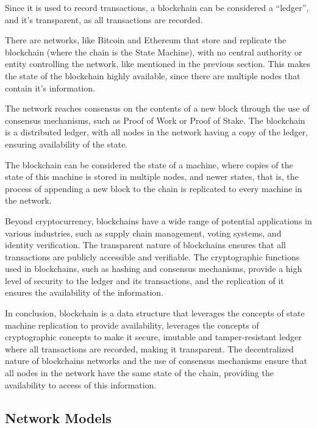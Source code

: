 Since it is used to record transactions, a blockchain can be considered a ``ledger'', and it's transparent, as all transactions are recorded.

There are networks, like Bitcoin and Ethereum that store and replicate the blockchain (where the chain is the State Machine), with no central authority or entity controlling the network, like mentioned in the previous section. This makes the state of the blockchain highly available, since there are multiple nodes that contain it's information. 

The network reaches consensus on the contents of a new block through the use of consensus mechanisms, such as Proof of Work or Proof of Stake.
The blockchain is a distributed ledger, with all nodes in the network having a copy of the ledger, ensuring availability of the state.

The blockchain can be considered the state of a machine, where copies of the state of this machine is stored in multiple nodes, and newer states, that is, the process of appending a new block to the chain is replicated to every machine in the network.

Beyond cryptocurrency, blockchains have a wide range of potential applications in various industries, such as supply chain management, voting systems, and identity verification. The transparent nature of blockchains ensures that all transactions are publicly accessible and verifiable. The cryptographic functions used in blockchains, such as hashing and consensus mechanisms, provide a high level of security to the ledger and its transactions, and the replication of it ensures the availability of the information.

In conclusion, blockchain is a data structure that leverages the concepts of state machine replication to provide availability, leverages the concepts of cryptographic concepts to make it secure, imutable and tamper-resistant ledger where all transactions are recorded, making it transparent.
The decentralized nature of blockchains networks and the use of consensus mechanisms ensure that all nodes in the network have the same state of the chain, providing the availability to access of this information.

\subsection*{\textbf{Network Models}}

